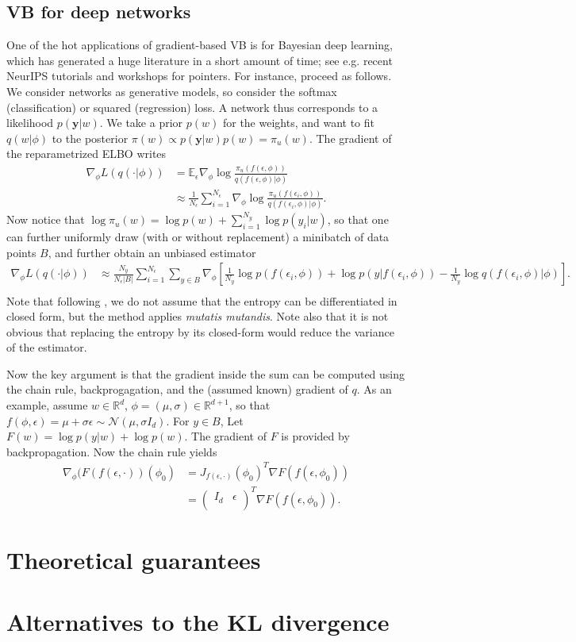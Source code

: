 \subsection{VB for deep networks}
One of the hot applications of gradient-based VB is for Bayesian deep learning, which has generated a huge literature in a short amount of time; see e.g. recent NeurIPS tutorials and workshops for pointers.  
For instance, \cite{BCKW15} proceed as follows.
We consider networks as generative models, so consider the softmax (classification) or squared (regression) loss.
A network thus corresponds to a likelihood $p(\mathbf{y}\vert w)$.
We take a prior $p(w)$ for the weights, and want to fit $q(w\vert\phi)$ to the posterior $\pi(w) \propto p(\mathbf{y}\vert w)p(w) = \pi_u(w)$.
The gradient of the reparametrized ELBO writes
\begin{align*}
\nabla_\phi L(q(\cdot\vert\phi)) &= \mathbb E_\epsilon \nabla_\phi \log \frac{\pi_u(f(\epsilon,\phi))}{q(f(\epsilon,\phi)\vert\phi)}\\
&\approx \frac{1}{N_\epsilon} \sum_{i=1}^{N_\epsilon} \nabla_\phi \log \frac{\pi_u(f(\epsilon_i,\phi))}{q(f(\epsilon_i,\phi)\vert\phi)}.
\end{align*}
Now notice that $\log\pi_u(w) = \log p(w) + \sum_{i=1}^{N_y} \log p(y_i\vert w)$, so that one can further uniformly draw (with or without replacement) a minibatch of data points $B$, and further obtain an unbiased estimator 
\begin{align*}
\nabla_\phi L(q(\cdot\vert\phi)) &\approx \frac{N_y}{N_\epsilon \vert B\vert} \sum_{i=1}^{N_\epsilon} \sum_{y\in B} \nabla_\phi \left [ \frac{1}{N_y}\log p(f(\epsilon_i,\phi)) + \log p(y\vert f(\epsilon_i,\phi)) - \frac{1}{N_y}\log q(f(\epsilon_i,\phi)\vert\phi) \right ].\\
\end{align*}
Note that following \cite{BCKW15}, we do not assume that the entropy can be differentiated in closed form, but the method applies \emph{mutatis mutandis}. 
Note also that it is not obvious that replacing the entropy by its closed-form would reduce the variance of the estimator.

Now the key argument is that the gradient inside the sum can be computed using the chain rule, backprogagation, and the (assumed known) gradient of $q$.
As an example, assume $w\in\mathbb{R}^d$, $\phi=(\mu,\sigma)\in\mathbb{R}^{d+1}$, so that $f(\phi,\epsilon) = \mu + \sigma \epsilon \sim \mathcal{N}(\mu, \sigma I_d)$. 
For $y\in B$, Let $F(w) = \log p(y\vert w) + \log p(w)$. 
The gradient of $F$ is provided by backpropagation. 
Now the chain rule yields
\begin{align*}
  \nabla_\phi (F(f(\epsilon, \cdot))(\phi_0) &= J_{f(\epsilon,\cdot)}(\phi_0)^T \nabla F (f(\epsilon, \phi_0))\\
  &= \begin{pmatrix} I_d & \epsilon \\\end{pmatrix}^T \nabla F (f(\epsilon, \phi_0)).
\end{align*}

\section{Theoretical guarantees}

\section{Alternatives to the KL divergence}
